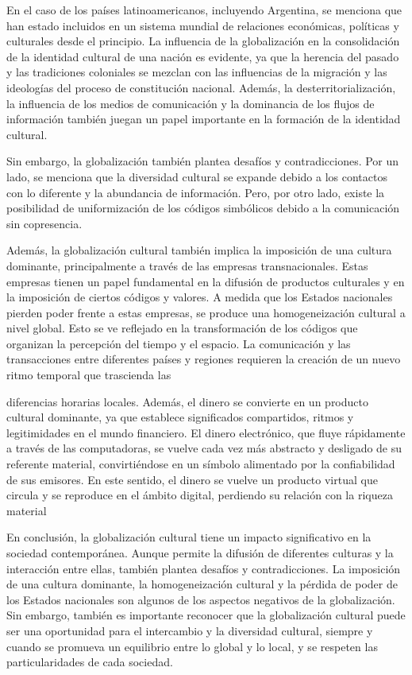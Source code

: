 \documentclass{article}
\theoremstyle{mytheoremstyle}
\theoremstyle{mytheoremstyle}
\theoremstyle{myproblemstyle}
\begin{document}
En el caso de los países latinoamericanos, incluyendo Argentina, se menciona que han estado incluidos en un sistema mundial de relaciones económicas, políticas y culturales desde el principio. La influencia de la globalización en la consolidación de la identidad cultural de una nación es evidente, ya que la herencia del pasado y las tradiciones coloniales se mezclan con las influencias de la migración y las ideologías del proceso de constitución nacional. Además, la desterritorialización, la influencia de los medios de comunicación y la dominancia de los flujos de información también juegan un papel importante en la formación de la identidad cultural.

Sin embargo, la globalización también plantea desafíos y contradicciones. Por un lado, se menciona que la diversidad cultural se expande debido a los contactos con lo diferente y la abundancia de información. Pero, por otro lado, existe la posibilidad de uniformización de los códigos simbólicos debido a la comunicación sin copresencia.

Además, la globalización cultural también implica la imposición de una cultura dominante, principalmente a través de las empresas transnacionales. Estas empresas tienen un papel fundamental en la difusión de productos culturales y en la imposición de ciertos códigos y valores. A medida que los Estados nacionales pierden poder frente a estas empresas, se produce una homogeneización cultural a nivel global. Esto se ve reflejado en la transformación de los códigos que organizan la percepción del tiempo y el espacio. La comunicación y las transacciones entre diferentes países y regiones requieren la creación de un nuevo ritmo temporal que trascienda las 

diferencias horarias locales. Además, el dinero se convierte en un producto cultural dominante, ya que establece significados compartidos, ritmos y legitimidades en el mundo financiero. El dinero electrónico, que fluye rápidamente a través de las computadoras, se vuelve cada vez más abstracto y desligado de su referente material, convirtiéndose en un símbolo alimentado por la confiabilidad de sus emisores. En este sentido, el dinero se vuelve un producto virtual que circula y se reproduce en el ámbito digital, perdiendo su relación con la riqueza material 

En conclusión, la globalización cultural tiene un impacto significativo en la sociedad contemporánea. Aunque permite la difusión de diferentes culturas y la interacción entre ellas, también plantea desafíos y contradicciones. La imposición de una cultura dominante, la homogeneización cultural y la pérdida de poder de los Estados nacionales son algunos de los aspectos negativos de la globalización. Sin embargo, también es importante reconocer que la globalización cultural puede ser una oportunidad para el intercambio y la diversidad cultural, siempre y cuando se promueva un equilibrio entre lo global y lo local, y se respeten las particularidades de cada sociedad.

    
\end{document}
